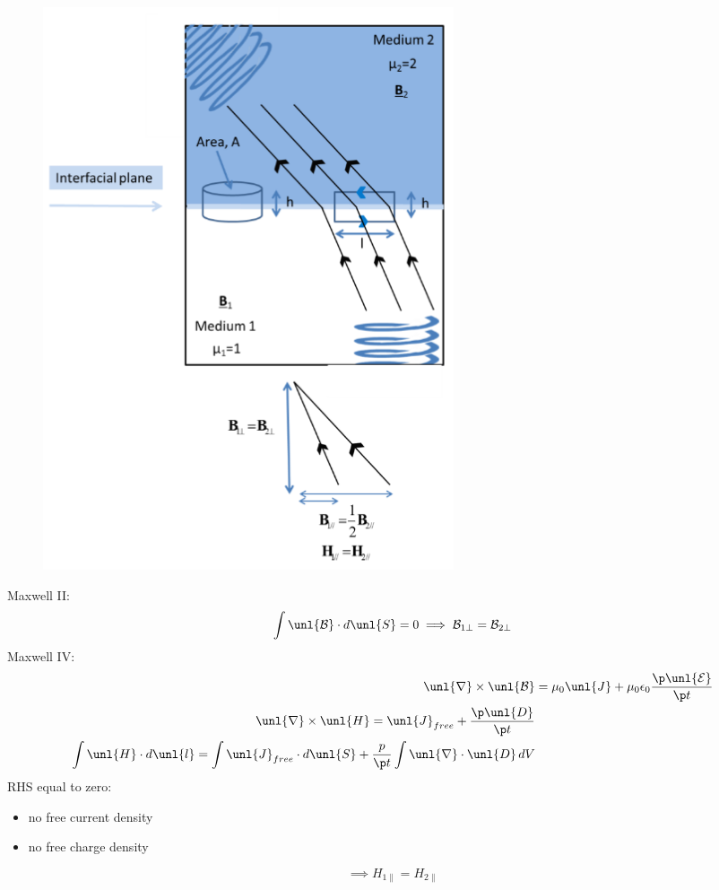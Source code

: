 \documentclass[a4paper, 11pt, normalem]{report}
\renewcommand\E{\mathcal{E}}
\newcommand\uE{\unl{\E}}
\renewcommand\B{\mathcal{B}}
\newcommand\uB{\unl{\B}}
\renewcommand\del{\unl{\nabla}}
\newcommand\eno{\epsilon_0}
\newcommand\J{\unl{J}}
\begin{document}
\begin{figure}[H]
  	\centering
  	\includegraphics[scale=0.4]{wolfgang2.png}
\end{figure}

Maxwell \RN{2}:
\begin{equation}
	\int \uB\cdot d\unl{S} = 0 \implies \B_{1\perp} = \B_{2\perp}
\end{equation}
Maxwell \RN{4}:
\begin{align}
	\del\times\uB &= \mu_0\J + \mu_0\eno\frac{\p\uE}{\p t} \\
	\del\times\unl{H} = \J_{free} + \frac{\p\unl{D}}{\p t} \\
	\int \unl{H}\cdot d\unl{l} = \int \J_{free}\cdot d\unl{S} + \frac{p}{\p t}\int \del\cdot\unl{D}\,dV
\end{align}
RHS equal to zero:
\begin{itemize}
	\item no free current density
	\item no free charge density
\end{itemize}
\begin{equation}
	\implies H_{1\parallel} = H_{2\parallel}
\end{equation}
\end{document}
